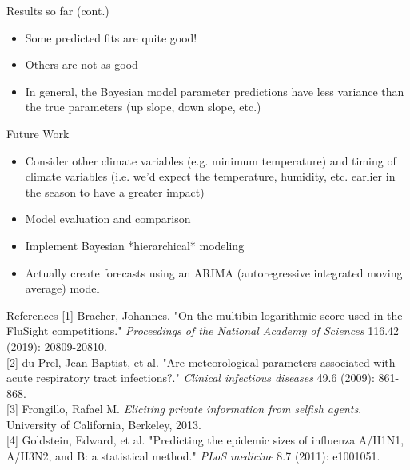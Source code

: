 \begin{block}{Results so far (cont.)}
\begin{center}
\begin{figure}
	\end{figure}
\end{center}
\begin{itemize}
	\item Some predicted fits are quite good! 
	\item Others are not as good
	\item In general, the Bayesian model parameter predictions have less variance than the true parameters (up slope, down slope, etc.)
\end{itemize}
\end{block}
\vspace{\colthreesep}

\begin{block}{Future Work}
	\begin{itemize}
		\item Consider other climate variables (e.g. minimum temperature) and timing of climate variables (i.e. we'd expect the temperature, humidity, etc. earlier in the season to have a greater impact)
		\item Model evaluation and comparison 
		\item Implement Bayesian *hierarchical* modeling
		\item Actually create forecasts using an ARIMA (autoregressive integrated moving average) model 
	\end{itemize}
\end{block}

\vspace{\colthreesep}

\begin{block}{References}
	\leftskip 01in
	\parindent -01in
	[1] Bracher, Johannes. "On the multibin logarithmic score used in the FluSight competitions."\textit{ Proceedings of the National Academy of Sciences} 116.42 (2019): 20809-20810. \\
	\vspace{.75ex}
	[2] du Prel, Jean-Baptist, et al. "Are meteorological parameters associated with acute respiratory tract infections?." \textit{Clinical infectious diseases} 49.6 (2009): 861-868. \\
	\vspace{.75ex}
	[3] Frongillo, Rafael M. \textit{Eliciting private information from selfish agents}. University of California, Berkeley, 2013. \\
	\vspace{.75ex}
	[4] Goldstein, Edward, et al. "Predicting the epidemic sizes of influenza A/H1N1, A/H3N2, and B: a statistical method." \textit{PLoS medicine} 8.7 (2011): e1001051. 

\end{block}

